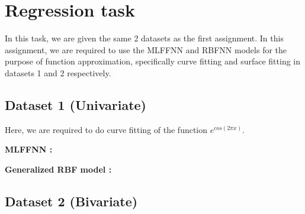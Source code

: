 \documentclass{article}
\begin{document}
\section{Regression task}
In this task, we are given the same 2 datasets as the first assignment. In this assignment, we are required to use the MLFFNN and RBFNN models for the purpose of function approximation, specifically curve fitting and surface fitting in datasets 1 and 2 respectively.


\subsection{Dataset 1 (Univariate)}
\begin{flushleft}
Here, we are required to do curve fitting of the function $e^{cos(2 \pi x)}$.
\end{flushleft}

\textbf{MLFFNN :}

\textbf{Generalized RBF model :}

\subsection{Dataset 2 (Bivariate)}




%
%
\end{document}

